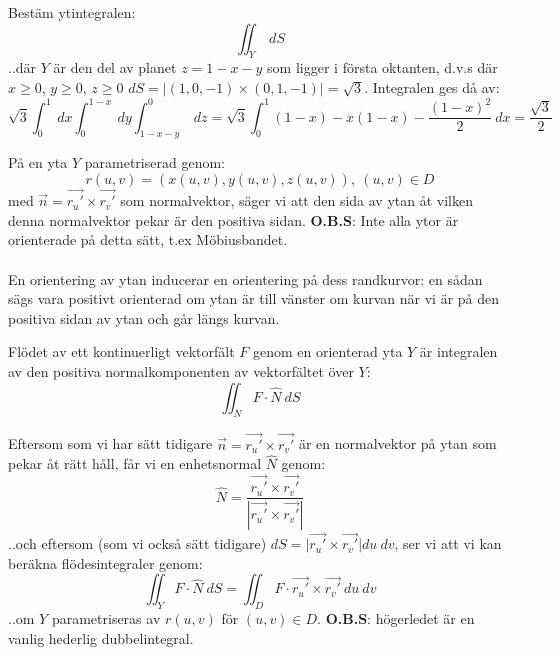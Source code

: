 \documentclass{report}
\begin{document}
\qs{}
{
Bestäm ytintegralen:
\begin{equation*}
\iint_{Y}^{}  \: dS  
\end{equation*}
..där $ Y $ är den del av planet $ z = 1 - x - y $ som ligger i första oktanten, d.v.s där $ x \ge 0 $, $ y \ge 0 $, $ z \ge 0 $
}
\sol $ dS = \bigl|  (1,0,-1) \times (0,1,-1) \bigr| = \sqrt{3}  $. Integralen ges då av:
\begin{equation*}
 \sqrt{3}  \int_{0}^{1}  \: dx \int_{0}^{1-x}  \: dy \int_{1-x-y}^{0}  \: dz = \sqrt{3} \int_{0}^{1} (1-x)-x(1-x)- \frac{(1-x)^2}{2}  \: dx =  \frac{ \sqrt{3} }{2}         
\end{equation*}

\vspace{20pt}
{
På en yta $ Y $ parametriserad genom:
\begin{equation*}
r(u,v) = (x(u,v), y(u,v), z(u,v)), \: (u,v) \in D
\end{equation*}
med $ \vec{n} = \vec{r_u'} \times \vec{r_v'}  $ som normalvektor, säger vi att den sida av ytan åt vilken denna normalvektor pekar är den positiva sidan. \textbf{O.B.S}: Inte alla ytor är orienterade på detta sätt, t.ex Möbiusbandet.\\\\

En orientering av ytan inducerar en orientering på dess randkurvor: en sådan sägs vara positivt orienterad om ytan är till vänster om kurvan när vi är på den positiva sidan av ytan och går längs kurvan.
}

{
Flödet av ett kontinuerligt vektorfält $ F $ genom en orienterad yta $ Y $ är integralen av den positiva normalkomponenten av vektorfältet över $ Y $:
\begin{equation*}
\iint_{N}^{} F \cdot \hat{N}  \: dS 
\end{equation*}

Eftersom som vi har sätt tidigare $ \vec{n} = \vec{r_u'} \times \vec{r_v'}  $ är en normalvektor på ytan som pekar åt rätt håll, får vi en enhetsnormal $ \hat{N} $ genom:
\begin{equation*}
	\hat{N} = \frac{ \vec{r_u'} \times \vec{r_v'} }{| \vec{r_u'} \times \vec{r_v'}  |} 
\end{equation*}
..och eftersom (som vi också sätt tidigare) $ dS = \bigl| \vec{r_u'} \times \vec{r_v'} \bigr| du\:dv $, ser vi att vi kan beräkna flödesintegraler genom:
\begin{equation*}
	\iint_{Y}^{} F \cdot \hat{N} \: dS = \iint_{D}^{} F \cdot \vec{r_u'} \times \vec{r_v'}  \: du   \: dv 
\end{equation*}
..om $ Y $ parametriseras av $ r(u,v) $ för $ (u,v) \in D $. \textbf{O.B.S}: högerledet är en vanlig hederlig dubbelintegral.
}
\end{document}
